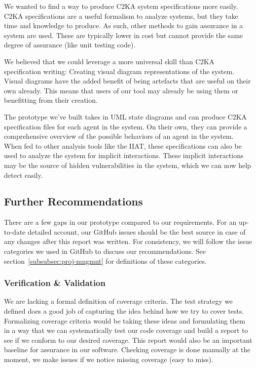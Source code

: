 We wanted to find a way to produce C2KA system specifications more easily.
C2KA specifications are a useful formalism to analyze systems, but they take time and knowledge to produce.
As such, other methods to gain assurance in a system are used.
These are typically lower in cost but cannot provide the same degree of assurance (like unit testing code).

We believed that we could leverage a more universal skill than C2KA specification writing:
Creating visual diagram representations of the system.
Visual diagrams have the added benefit of being artefacts that are useful on their own already.
This means that users of our tool may already be using them or benefitting from their creation.

The prototype we've built takes in UML state diagrams and can produce C2KA specification files for each agent in the system.
On their own, they can provide a comprehensive overview of the possible behaviors of an agent in the system.
When fed to other analysis tools like the IIAT,
these specifications can also be used to analyze the system for implicit interactions.
These implicit interactions may be the source of hidden vulnerabilities in the system,
which we can now help detect easily.

\subsection{Further Recommendations}\label{subsec:further-recommendations}
There are a few gaps in our prototype compared to our requirements.
For an up-to-date detailed account, our GitHub issues should be the best source in case of any changes after this report was written.
For consistency, we will follow the issue categories we used in GitHub to discuss our recommendations.
See section~\ref{subsubsec:proj-mngmnt} for definitions of these categories.

\subsubsection{Verification \& Validation}\label{subsubsec:rec-v-v}
We are lacking a formal definition of coverage criteria.
The test strategy we defined does a good job of capturing the idea behind how we try to cover tests.
Formalizing coverage criteria would be taking these ideas and formulating them in a way that we can systematically
test our code coverage and build a report to see if we conform to our desired coverage.
This report would also be an important baseline for assurance in our software.
Checking coverage is done manually at the moment, we make issues if we notice missing coverage (easy to miss).

